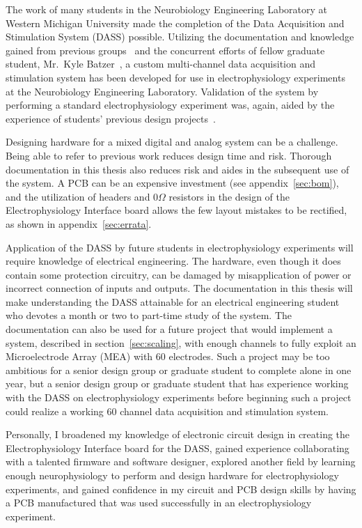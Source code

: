 The work of many students in the Neurobiology Engineering Laboratory at Western Michigan University made the completion of the Data Acquisition and Stimulation System (DASS) possible.  Utilizing the documentation and knowledge gained from previous groups~\cite{ArmstrongSD,McCaskeyPackaralJohnVandeusen07,CarusoDaiekJones,StahlMSEE,BatzerCorsiCrampton} and the concurrent efforts of fellow graduate student, Mr.~Kyle Batzer~\cite{BatzerMSEE}, a custom multi-channel data acquisition and stimulation system has been developed for use in electrophysiology experiments at the Neurobiology Engineering Laboratory.  Validation of the system by performing a standard electrophysiology experiment was, again, aided by the experience of students' previous design projects~\cite{StahlMSEE,EllingerMSEE}.

Designing hardware for a mixed digital and analog system can be a challenge.  Being able to refer to previous work reduces design time and risk.  Thorough documentation in this thesis also reduces risk and aides in the subsequent use of the system.  A PCB can be an expensive investment (see appendix~\ref{sec:bom}), and the utilization of headers and $0\unit{\Omega}$ resistors in the design of the Electrophysiology Interface board allows the few layout mistakes to be rectified, as shown in appendix~\ref{sec:errata}.

Application of the DASS by future students in electrophysiology experiments will require knowledge of electrical engineering.  The hardware, even though it does contain some protection circuitry, can be damaged by misapplication of power or incorrect connection of inputs and outputs.  The documentation in this thesis will make understanding the DASS attainable for an electrical engineering student who devotes a month or two to part-time study of the system.  The documentation can also be used for a future project that would implement a system, described in section~\ref{sec:scaling}, with enough channels to fully exploit an Microelectrode Array (MEA) with 60 electrodes.  Such a project may be too ambitious for a senior design group or graduate student to complete alone in one year, but a senior design group or graduate student that has experience working with the DASS on electrophysiology experiments before beginning such a project could realize a working 60 channel data acquisition and stimulation system.

Personally, I broadened my knowledge of electronic circuit design in creating the Electrophysiology Interface board for the DASS, gained experience collaborating with a talented firmware and software designer, explored another field by learning enough neurophysiology to perform and design hardware for electrophysiology experiments, and gained confidence in my circuit and PCB design skills by having a PCB manufactured that was used successfully in an electrophysiology experiment.

